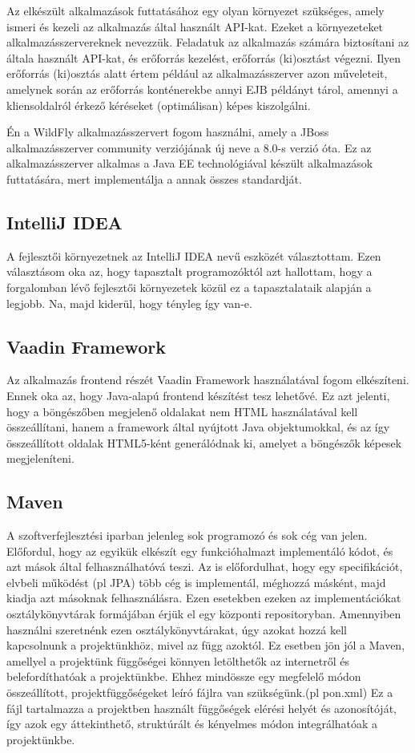 \documentclass[centeredchapter]{thesis-ekf}
\theoremstyle{definition}
\theoremstyle{remark}
\begin{document}
Az elkészült alkalmazások futtatásához egy olyan környezet szükséges, amely ismeri és kezeli az alkalmazás által használt API-kat. Ezeket a környezeteket alkalmazásszervereknek nevezzük. 
Feladatuk az alkalmazás számára biztosítani az általa használt API-kat, és erőforrás kezelést, erőforrás (ki)osztást végezni. Ilyen erőforrás (ki)osztás alatt értem például az alkalmazásszerver azon műveleteit, amelynek során az erőforrás konténerekbe annyi EJB példányt tárol, amennyi a kliensoldalról érkező kéréseket (optimálisan) képes kiszolgálni.

Én a WildFly alkalmazásszervert fogom használni, amely a JBoss alkalmazásszerver community verziójának új neve a 8.0-s verzió óta. Ez az alkalmazásszerver alkalmas a Java EE technológiával készült alkalmazások futtatására, mert implementálja a annak összes standardját.  

\subsection{IntelliJ IDEA}

A fejlesztői környezetnek az IntelliJ IDEA nevű eszközét választottam. Ezen választásom oka az, hogy tapasztalt programozóktól azt hallottam, hogy a forgalomban lévő fejlesztői környezetek közül ez a tapasztalataik alapján a legjobb. Na, majd kiderül, hogy tényleg így van-e.

\subsection{Vaadin Framework}

Az alkalmazás frontend részét Vaadin Framework használatával fogom elkészíteni. Ennek oka az, hogy Java-alapú frontend készítést tesz lehetővé. Ez azt jelenti, hogy a böngészőben megjelenő oldalakat nem HTML használatával kell összeállítani, hanem a framework által nyújtott Java objektumokkal, és az így összeállított oldalak HTML5-ként generálódnak ki, amelyet a böngészők képesek megjeleníteni.

\subsection{Maven}

A szoftverfejlesztési iparban jelenleg sok programozó és sok cég van jelen. Előfordul, hogy az egyikük elkészít egy funkcióhalmazt implementáló kódot, és azt mások által felhasználhatóvá teszi.
Az is előfordulhat, hogy egy specifikációt, elvbeli működést (pl JPA) több cég is implementál, méghozzá másként, majd kiadja azt másoknak felhasználásra. Ezen esetekben ezeken az implementációkat osztálykönyvtárak formájában érjük el egy központi repositoryban. Amennyiben használni szeretnénk ezen osztálykönyvtárakat, úgy azokat hozzá kell kapcsolnunk a projektünkhöz, mivel az függ azoktól. Ez esetben jön jól a Maven, amellyel a projektünk függőségei könnyen letölthetők az internetről és belefordíthatóak a projektünkbe. Ehhez mindössze egy megfelelő módon összeállított, projektfüggőségeket leíró fájlra van szükségünk.(pl pon.xml) Ez a fájl tartalmazza a projektben használt függőségek elérési helyét és azonosítóját, így azok egy áttekinthető, struktúrált és kényelmes módon integrálhatóak a projektünkbe.
\end{document}
